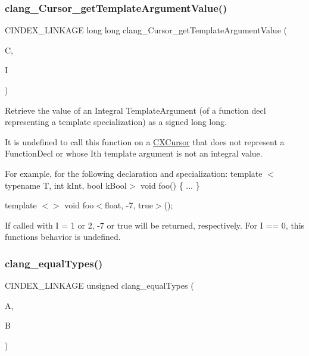 \subsubsection{\texorpdfstring{clang\+\_\+\+Cursor\+\_\+get\+Template\+Argument\+Value()}{clang\_Cursor\_getTemplateArgumentValue()}}
{\footnotesize\ttfamily C\+I\+N\+D\+E\+X\+\_\+\+L\+I\+N\+K\+A\+GE long long clang\+\_\+\+Cursor\+\_\+get\+Template\+Argument\+Value (\begin{DoxyParamCaption}\item[{\hyperlink{structCXCursor}{C\+X\+Cursor}}]{C,  }\item[{unsigned}]{I }\end{DoxyParamCaption})}



Retrieve the value of an Integral Template\+Argument (of a function decl representing a template specialization) as a signed long long. 

It is undefined to call this function on a \hyperlink{structCXCursor}{C\+X\+Cursor} that does not represent a Function\+Decl or whose I\textquotesingle{}th template argument is not an integral value.

For example, for the following declaration and specialization\+: template $<$typename T, int k\+Int, bool k\+Bool$>$ void foo() \{ ... \}

template $<$$>$ void foo$<$float, -\/7, true$>$();

If called with I = 1 or 2, -\/7 or true will be returned, respectively. For I == 0, this function\textquotesingle{}s behavior is undefined. \mbox{\label{group__CINDEX__TYPES_gac047de2ab0f7e1b1586d8317a658a1d9}} 
\subsubsection{\texorpdfstring{clang\+\_\+equal\+Types()}{clang\_equalTypes()}}
{\footnotesize\ttfamily C\+I\+N\+D\+E\+X\+\_\+\+L\+I\+N\+K\+A\+GE unsigned clang\+\_\+equal\+Types (\begin{DoxyParamCaption}\item[{\hyperlink{structCXType}{C\+X\+Type}}]{A,  }\item[{\hyperlink{structCXType}{C\+X\+Type}}]{B }\end{DoxyParamCaption})}



